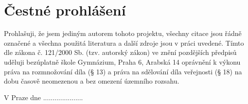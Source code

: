 \thispagestyle{empty} %

\section*{Čestné prohlášení}
Prohlašuji, že jsem jediným autorem tohoto projektu, všechny citace jsou řádně označené a všechna použitá literatura a další zdroje jsou v práci uvedené. Tímto dle zákona č. 121/2000 Sb. (tzv. autorský zákon) ve znění pozdějších předpisů uděluji bezúplatně škole Gymnázium, Praha 6, Arabská 14 oprávnění k výkonu práva na rozmnožování díla (§ 13) a práva na sdělování díla veřejnosti (§ 18) na dobu časově neomezenou a bez omezení územního rozsahu.
\par V Praze dne .....................